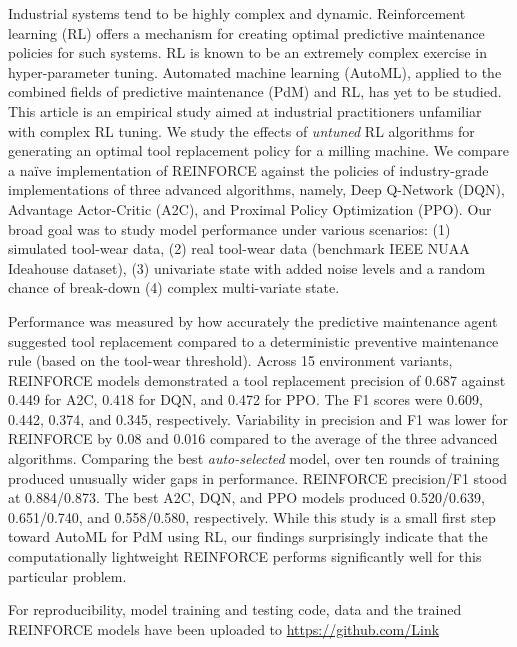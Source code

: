\documentclass[a4paper, 12pt]{article}
\renewenvironment{abstract}
{\small
	\begin{center}
		\bfseries \abstractname\vspace{-.5em}\vspace{0pt}
	\end{center}
	\list{}{
		\setlength{\leftmargin}{.25cm}%
		\setlength{\rightmargin}{\leftmargin}%
	}%
	\item\relax}
{\endlist}
\begin{document}
\begin{abstract}
Industrial systems tend to be highly complex and dynamic. Reinforcement learning (RL) offers a mechanism for creating optimal predictive maintenance policies for such systems. RL is known to be an extremely complex exercise in hyper-parameter tuning. Automated machine learning (AutoML), applied to the combined fields of predictive maintenance (PdM) and RL, has yet to be studied. This article is an empirical study aimed at industrial practitioners unfamiliar with complex RL tuning. We study the effects of \textit{untuned} RL algorithms for generating an optimal tool replacement policy for a milling machine. We compare a na\"ive implementation of REINFORCE against the policies of industry-grade implementations of three advanced algorithms, namely, Deep Q-Network (DQN), Advantage Actor-Critic (A2C), and Proximal Policy Optimization (PPO). Our broad goal was to study model performance under various scenarios: (1) simulated tool-wear data, (2) real tool-wear data  (benchmark IEEE NUAA Ideahouse dataset), (3) univariate state with added noise levels and a random chance of break-down (4) complex multi-variate state.

Performance was measured by how accurately the predictive maintenance agent suggested tool replacement compared to a deterministic preventive maintenance rule (based on the tool-wear threshold). Across 15 environment variants, REINFORCE models demonstrated a tool replacement precision of 0.687 against 0.449 for A2C, 0.418 for DQN, and 0.472 for PPO. The F1 scores were 0.609, 0.442, 0.374, and 0.345, respectively. Variability in precision and F1 was lower for REINFORCE by 0.08 and 0.016 compared to the average of the three advanced algorithms. Comparing the best \textit{auto-selected} model, over ten rounds of training produced unusually wider gaps in performance. REINFORCE precision/F1 stood at 0.884/0.873. The best A2C, DQN, and PPO models produced 0.520/0.639, 0.651/0.740, and 0.558/0.580, respectively. While this study is a small first step toward AutoML for PdM using RL, our findings surprisingly indicate that the computationally lightweight REINFORCE performs significantly well for this particular problem.

For reproducibility, model training and testing code, data and the trained REINFORCE models have been uploaded to \href{https://github.com/Rajesh-Siraskar/Empirical-Study\_REINFORCE-for-predictive-maintenance}{https://github.com/Link} 
\end{abstract}
\end{document}
